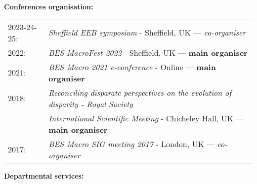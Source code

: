 \documentclass[10pt,a4paper]{article}
\begin{document}
{\bigskip

\raggedright\textbf{Conferences organisation:}\\
\begin{tabular}{ll}
2023-24-25: & \textit{Sheffield EEB symposium} - Sheffield, UK --- \textit{co-organiser}\\
2022: & \textit{BES MacroFest 2022} - Sheffield, UK --- \textbf{main organiser}\\
2021: & \textit{BES Macro 2021 e-conference} - Online --- \textbf{main organiser}\\
2018: & \textit{Reconciling disparate perspectives on the evolution of disparity - Royal Society}\\
      & \textit{International Scientific Meeting} - Chicheley Hall, UK --- \textbf{main organiser}\\
2017: & \textit{BES Macro SIG meeting 2017} - London, UK --- \textit{co-organiser}\\
\end{tabular}

\bigskip


\raggedright\textbf{Departmental services:}

}
\end{document}
